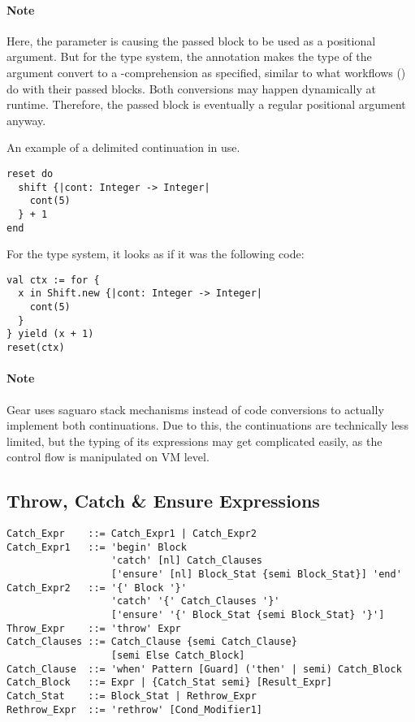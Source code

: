 \paragraph{Note}
Here, the  parameter is causing the passed block to be used as a positional argument. But for the type system, the annotation  makes the type of the argument convert to a -comprehension as specified, similar to what workflows () do with their passed blocks. Both conversions may happen dynamically at runtime. Therefore, the passed block is eventually a regular positional argument anyway. 

\example An example of a delimited continuation in use. 
\begin{lstlisting}
reset do
  shift {|cont: Integer -> Integer|
    cont(5)
  } + 1
end
\end{lstlisting}
For the type system, it looks as if it was the following code:
\begin{lstlisting}
val ctx := for {
  x in Shift.new {|cont: Integer -> Integer|
    cont(5)
  }
} yield (x + 1)
reset(ctx)
\end{lstlisting}

\paragraph{Note}
Gear uses saguaro stack mechanisms instead of code conversions to actually implement both continuations. Due to this, the continuations are technically less limited, but the typing of its expressions may get complicated easily, as the control flow is manipulated on VM level.






\subsection{Throw, Catch \& Ensure Expressions}
\label{sec:throw-catch-expressions}

\syntax\begin{lstlisting}
Catch_Expr    ::= Catch_Expr1 | Catch_Expr2
Catch_Expr1   ::= 'begin' Block 
                  'catch' [nl] Catch_Clauses
                  ['ensure' [nl] Block_Stat {semi Block_Stat}] 'end'
Catch_Expr2   ::= '{' Block '}'
                  'catch' '{' Catch_Clauses '}'
                  ['ensure' '{' Block_Stat {semi Block_Stat} '}']
Throw_Expr    ::= 'throw' Expr
Catch_Clauses ::= Catch_Clause {semi Catch_Clause}
                  [semi Else Catch_Block]
Catch_Clause  ::= 'when' Pattern [Guard] ('then' | semi) Catch_Block
Catch_Block   ::= Expr | {Catch_Stat semi} [Result_Expr]
Catch_Stat    ::= Block_Stat | Rethrow_Expr
Rethrow_Expr  ::= 'rethrow' [Cond_Modifier1]
\end{lstlisting}

